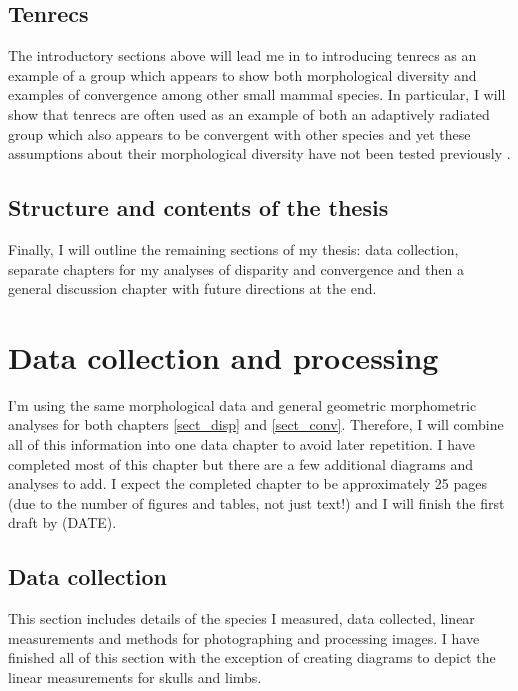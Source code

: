 \documentclass[12pt,a4paper]{article}
\begin{document}
	\subsection{Tenrecs}
		\label{int_tenrecs}
		The introductory sections above will lead me in to introducing tenrecs as an example of a group which appears to show both morphological diversity and examples of convergence among other small mammal species. In particular, I will show that tenrecs are often used as an example of both an adaptively radiated group which also appears to be convergent with other species and yet these assumptions about their morphological diversity have not been tested previously \citep[e.g.][]{Eisenberg1969, Soarimalala2011, Olson2013}. 
			 
	\subsection{Structure and contents of the thesis}
		\label{int_struc} 
		Finally, I will outline the remaining sections of my thesis: data collection, separate chapters for my analyses of disparity and convergence and then a general discussion chapter with future directions at the end.

\section{Data collection and processing}
	
	I'm using the same morphological data and general geometric morphometric analyses for both chapters \ref{sect_disp} and \ref*{sect_conv}. Therefore, I will combine all of this information into one data chapter to avoid later repetition. I have completed most of this chapter but there are a few additional diagrams and analyses to add. I expect the completed chapter to be approximately 25 pages (due to the number of figures and tables, not just text!) and I will finish the first draft by (DATE).

	\subsection{Data collection}
		This section includes details of the species I measured, data collected, linear measurements and methods for photographing and processing images. I have finished all of this section with the exception of creating diagrams to depict the linear measurements for skulls and limbs.
\end{document}
